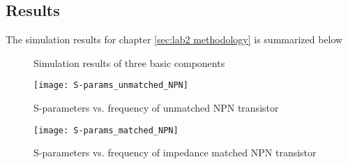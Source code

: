 \documentclass[report.tex]{subfiles}
\begin{document}
\clearpage
\subsection{Results}
\label{sec:lab2_results}
The simulation results for chapter \ref{sec:lab2 methodology} is summarized below

\begin{figure}[h]
    \centering
    \caption{Simulation results of three basic components}
\end{figure}
\clearpage

\begin{figure}
    \centering
    \texttt{[image: S-params\_unmatched\_NPN]}
    \caption{S-parameters vs. frequency of unmatched NPN transistor}
\end{figure}
\clearpage

\begin{figure}
    \centering
    \texttt{[image: S-params\_matched\_NPN]}
    \caption{S-parameters vs. frequency of impedance matched NPN transistor}
\end{figure}
\clearpage
\end{document}
